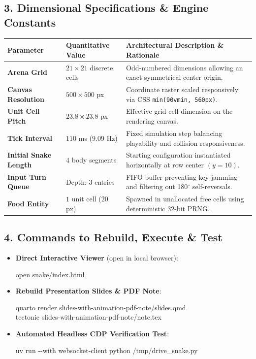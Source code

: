 \documentclass[10pt,a4paper]{article}
\newcommand{\cmdbox}[1]{%
  \vspace{0.15em}%
  \noindent\colorbox{codebg}{%
    \parbox{\dimexpr\linewidth-2\fboxsep\relax}{\raggedright\ttfamily\small #1}%
  }%
  \vspace{0.15em}%
}
\begin{document}
\subsection*{3. Dimensional Specifications \& Engine Constants}
\vspace{-0.3em}
\noindent
\begin{table}[h!]
    \centering
    \small
    \begin{tabularx}{\textwidth}{l p{3.2cm} X}
        \toprule
        \textbf{Parameter} & \textbf{Quantitative Value} & \textbf{Architectural Description \& Rationale} \\
        \midrule
        \textbf{Arena Grid} & $21 \times 21$ discrete cells & Odd-numbered dimensions allowing an exact symmetrical center origin. \\
        \textbf{Canvas Resolution} & $500 \times 500$ px & Coordinate raster scaled responsively via CSS \texttt{min(90vmin, 560px)}. \\
        \textbf{Unit Cell Pitch} & $23.8 \times 23.8$ px & Effective grid cell dimension on the rendering canvas. \\
        \textbf{Tick Interval} & $110$ ms ($9.09$ Hz) & Fixed simulation step balancing playability and collision responsiveness. \\
        \textbf{Initial Snake Length} & $4$ body segments & Starting configuration instantiated horizontally at row center $(y=10)$. \\
        \textbf{Input Turn Queue} & Depth: $3$ entries & FIFO buffer preventing key jamming and filtering out 180$^\circ$ self-reversals. \\
        \textbf{Food Entity} & $1$ unit cell ($20$ px) & Spawned in unallocated free cells using deterministic 32-bit PRNG. \\
        \bottomrule
    \end{tabularx}
\end{table}

\vspace{-1.3em}
\subsection*{4. Commands to Rebuild, Execute \& Test}
\vspace{-0.3em}
\begin{itemize}[leftmargin=*,itemsep=1.5pt,topsep=1pt]
    \item \textbf{Direct Interactive Viewer} (open in local browser):\\
    \cmdbox{open snake/index.html}
    \item \textbf{Rebuild Presentation Slides \& PDF Note}:\\
    \cmdbox{quarto render slides-with-animation-pdf-note/slides.qmd\\
    tectonic slides-with-animation-pdf-note/note.tex}
    \item \textbf{Automated Headless CDP Verification Test}:\\
    \cmdbox{uv run -{}-with websocket-client python /tmp/drive\_snake.py}
\end{itemize}
\end{document}
